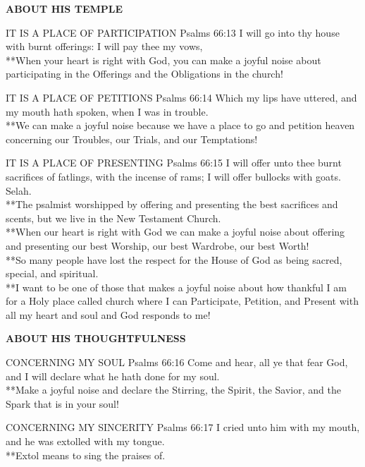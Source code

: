 \begin{compactenum}[I.][5]
    \item \textbf{ABOUT HIS TEMPLE}
    \begin{compactenum}[A.]
        \item  IT IS A PLACE OF PARTICIPATION
Psalms 66:13  I will go into thy house with burnt offerings: I will pay thee my vows, \\
**When your heart is right with God, you can make a joyful noise about participating in the Offerings and the Obligations in the church!
        \item   IT IS A PLACE OF PETITIONS
Psalms 66:14   Which my lips have uttered, and my
mouth hath spoken, when I was in trouble.\\
**We can make a joyful noise because we have a place to go and petition heaven concerning our Troubles, our Trials, and our Temptations!
        \item  IT IS A PLACE OF PRESENTING
Psalms 66:15  I will offer unto thee burnt sacrifices
of fatlings, with the incense of rams; I will offer bullocks with goats.  Selah.\\
**The psalmist worshipped by offering and presenting the best sacrifices and scents, but we live in the New Testament Church.\\
**When our heart is right with God we can make a joyful noise about offering and presenting our best Worship, our best Wardrobe, our best Worth!\\
**So many people have lost the respect for the House of God as being sacred, special, and spiritual.\\
**I want to be one of those that makes a joyful noise about how thankful I am for a Holy place called church where I can Participate, Petition, and Present with all my heart and soul and God responds to me!
    \end{compactenum}
    \item \textbf{ABOUT HIS THOUGHTFULNESS}
    \begin{compactenum}[A.]
        \item CONCERNING MY SOUL
Psalms 66:16  Come and hear, all ye that fear God, and I
will declare what he hath done for my soul.\\
**Make a joyful noise and declare the Stirring, the Spirit, the Savior, and the Spark that is in your soul!
        \item CONCERNING MY SINCERITY 
Psalms 66:17  I cried unto him with my mouth, and he
was extolled with my tongue. \\
**Extol means to sing the praises of.\\

\end{compactenum}
\end{compactenum}
